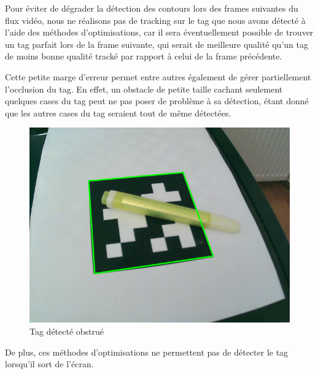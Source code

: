         Pour éviter de dégrader la détection des contours lors des frames suivantes du flux vidéo, nous ne réalisons pas de tracking sur le tag que nous avons détecté à l'aide des méthodes d'optimisations, car il sera éventuellement possible de trouver un tag parfait lors de la frame suivante, qui serait de meilleure qualité qu'un tag de moins bonne qualité tracké par rapport à celui de la frame précédente.

        Cette petite marge d'erreur permet entre autres également de gérer partiellement l'occlusion du tag. En effet, un obstacle de petite taille cachant seulement quelques cases du tag peut ne pas poser de problème à sa détection, étant donné que les autres cases du tag seraient tout de même détectées.

        \begin{figure}[!h]
            \centering
            \includegraphics[scale=0.35]{img/tag_occlusion.png}
            \caption{Tag détecté obstrué}
            \label{fig:tag_occlusion}
        \end{figure}

        De plus, ces méthodes d'optimisations ne permettent pas de détecter le tag lorsqu'il sort de l'écran.
